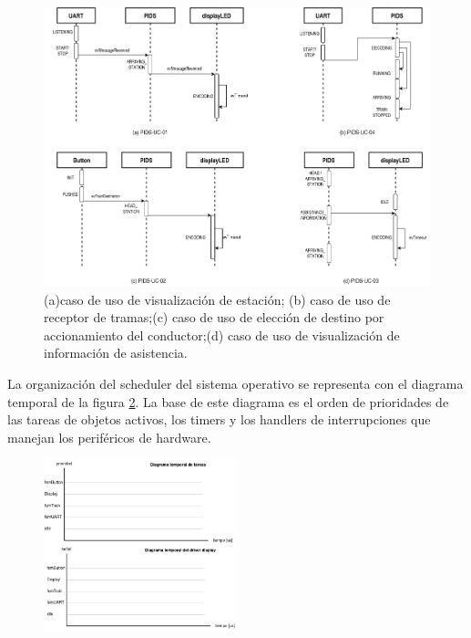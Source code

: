 \begin{figure}[ht]
	\centering
	\includegraphics[width=1\textwidth]{../Figures/secuenciasSistema.png}
	\caption{(a)caso de uso de visualización de estación; (b) caso de uso de receptor de tramas;(c) caso de uso de elección de destino por accionamiento del conductor;(d) caso de uso de visualización de información de asistencia.}
	\label{fig:diagramaSecuenciaSistema}
\end{figure}


La organización del scheduler del sistema operativo se representa con el diagrama temporal de la figura \ref{fig:diagramasTemporales}. La base de este diagrama es el orden de prioridades de las tareas de objetos activos, los timers y los handlers de interrupciones que manejan los periféricos de hardware.\\


\begin{figure}[ht]
	\centering
	\includegraphics[width=0.5\textwidth]{./Figures/diagramasTemporales.png}
	\caption{}
	\label{fig:diagramasTemporales}
\end{figure}

